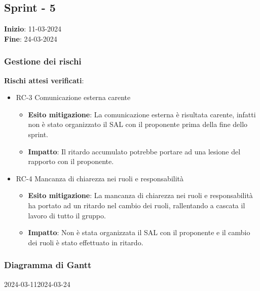 \subsection{Sprint - 5}
\textbf{Inizio}: 11-03-2024 \\
\textbf{Fine}: 24-03-2024

\subsubsection{Gestione dei rischi}
\textbf{Rischi attesi verificati}:

\begin{itemize}
	\item RC-3 Comunicazione esterna carente
	      \begin{itemize}
		      \item \textbf{Esito mitigazione}: La comunicazione esterna è
		            risultata carente, infatti non è stato organizzato il SAL
		            con il proponente prima della fine dello sprint.

		      \item \textbf{Impatto}: Il ritardo accumulato potrebbe portare
		            ad una lesione del rapporto con il proponente.
	      \end{itemize}

	\item RC-4 Mancanza di chiarezza nei ruoli e responsabilità
	      \begin{itemize}
		      \item \textbf{Esito mitigazione}: La mancanza di chiarezza nei
		            ruoli e responsabilità ha portato ad un ritardo nel cambio
		            dei ruoli, rallentando a cascata il lavoro di tutto il
		            gruppo.

		      \item \textbf{Impatto}: Non è stata organizzata il SAL con il
		            proponente e il cambio dei ruoli è stato effettuato in
		            ritardo.
	      \end{itemize}
\end{itemize}

\subsubsection{Diagramma di Gantt}

\begin{ganttchart}[
		x unit=0.6cm, %
		y unit chart=0.6cm,
		bar/.style={fill=blue!50},
		bar height=0.5,
		time slot format=isodate,
		time slot unit=day,
		vgrid,
		today=2024-03-12,
		today rule/.style={draw=red, ultra thick}
	]{2024-03-11}{2024-03-24}
	 \\
	 \\
	 \\
	 \\
	 \\
\end{ganttchart}

